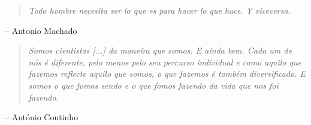 \null\vskip4cm%
\begin{quote}
\emph{Todo hombre necesita ser lo que es para hacer lo que hace. Y viceversa.}
\end{quote}
\vspace{-\baselineskip}
\begin{flushright}
-- Antonio Machado
\end{flushright}

\vskip1cm%
\begin{quote}
\emph{Somos cientistas [...] da maneira que somos. E ainda bem. Cada um de nós é diferente, pelo menos pelo seu percurso individual e como aquilo que fazemos reflecte aquilo que somos, o que fazemos é também diversificado. E somos o que fomos sendo e o que fomos fazendo da vida que nos foi fazendo.}
\end{quote}
\vspace{-\baselineskip}
\begin{flushright}
-- António Coutinho
\end{flushright}
\vfill\newpage